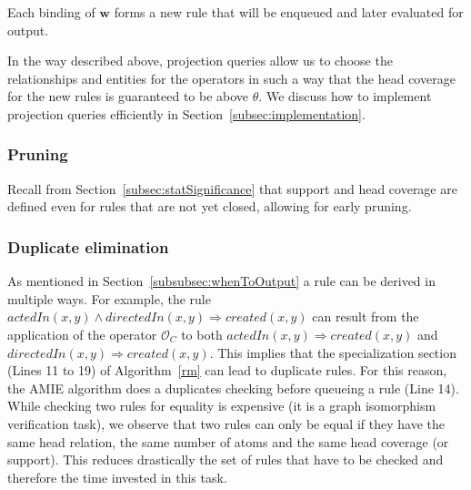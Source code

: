 {\noindent Each binding of $\bm{w}$ forms a new rule that will be enqueued and later evaluated for output.

In the way described above, projection queries allow us to choose the relationships and entities for the operators 
in such a way that the head coverage for the new rules is guaranteed to be above $\theta$.
We discuss how to implement projection queries efficiently in Section~\ref{subsec:implementation}.

\subsubsection{Pruning} 
\label{subsubsec:pruning}
Recall from Section~\ref{subsec:statSignificance} that support and head coverage are defined even for rules that are not yet closed, allowing for early pruning.

\subsubsection{Duplicate elimination} 
\label{subsubsec:duplicateElimination}
As mentioned in Section~\ref{subsubsec:whenToOutput} a rule can be derived in multiple ways.
For example, the rule $actedIn(x,y) \wedge directedIn(x,y) \Rightarrow created(x,y)$ can result from the application
of the operator $\mathcal{O}_C$ to both $actedIn(x,y) \Rightarrow created(x,y)$ and $directedIn(x,y) \Rightarrow created(x,y)$.
This implies that the specialization section (Lines 11 to 19) of Algorithm~\ref{rm} can lead to duplicate rules.
For this reason, the AMIE algorithm does a duplicates checking before queueing a rule (Line 14). 
While checking two rules for equality is expensive (it is a graph isomorphism verification task), 
we observe that two rules can only be equal if they have the same head relation, the same number of atoms and
the same head coverage (or support). This reduces drastically the set of rules that have to be checked and therefore
the time invested in this task. 

}
